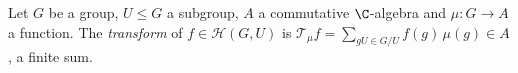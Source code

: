 Let $G$ be a group, $U\le G$ a subgroup, $A$ a commutative $\C$-algebra and $\mu\colon G\to A$ a function. The \emph{transform} of $f\in\mathcal H(G,U)$ is $\mathcal T_\mu f=\sum_{gU\in G/U}f(g)\,\mu(g)\in A$, a finite sum.
